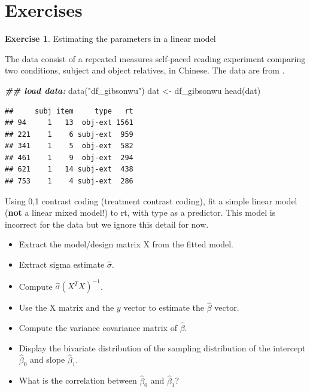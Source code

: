 \documentclass[
  12pt,
]{krantz}
\newenvironment{Shaded}{\begin{snugshade}}{\end{snugshade}}
\newcommand{\DocumentationTok}[1]{\textcolor[rgb]{0.56,0.35,0.01}{\textbf{\textit{#1}}}}
\newcommand{\FunctionTok}[1]{\textcolor[rgb]{0.00,0.00,0.00}{#1}}
\newcommand{\NormalTok}[1]{#1}
\newcommand{\OtherTok}[1]{\textcolor[rgb]{0.56,0.35,0.01}{#1}}
\newcommand{\StringTok}[1]{\textcolor[rgb]{0.31,0.60,0.02}{#1}}
\providecommand{\tightlist}{%
  \setlength{\itemsep}{0pt}\setlength{\parskip}{0pt}}
\theoremstyle{definition}
\theoremstyle{definition}
\theoremstyle{definition}
\newtheorem{exercise}{Exercise}[chapter]
\theoremstyle{definition}
\theoremstyle{remark}
\begin{document}
\hypertarget{sec:LMExercises2}{%
\section{Exercises}\label{sec:LMExercises2}}

\begin{exercise}
\protect\hypertarget{exr:LMparamest}{}\label{exr:LMparamest}Estimating the parameters in a linear model
\end{exercise}

The data consist of a repeated measures self-paced reading experiment comparing two conditions, subject and object relatives, in Chinese. The data are from \citet{gibsonwu}.

\begin{Shaded}
\begin{Highlighting}[]
\DocumentationTok{\#\# load data:}
\FunctionTok{data}\NormalTok{(}\StringTok{"df\_gibsonwu"}\NormalTok{)}
\NormalTok{dat }\OtherTok{\textless{}{-}}\NormalTok{ df\_gibsonwu}
\FunctionTok{head}\NormalTok{(dat)}
\end{Highlighting}
\end{Shaded}

\begin{verbatim}
##     subj item     type   rt
## 94     1   13  obj-ext 1561
## 221    1    6 subj-ext  959
## 341    1    5  obj-ext  582
## 461    1    9  obj-ext  294
## 621    1   14 subj-ext  438
## 753    1    4 subj-ext  286
\end{verbatim}

Using 0,1 contrast coding (treatment contrast coding), fit a simple linear model (\textbf{not} a linear mixed model!) to rt, with type as a predictor. This model is incorrect for the data but we ignore this detail for now.

\begin{itemize}
\tightlist
\item
  Extract the model/design matrix X from the fitted model.
\item
  Extract sigma estimate \(\hat\sigma\).
\item
  Compute \(\hat\sigma (X^TX)^{-1}\).
\item
  Use the X matrix and the \(y\) vector to estimate the \(\hat\beta\) vector.
\item
  Compute the variance covariance matrix of \(\hat\beta\).
\item
  Display the bivariate distribution of the sampling distribution of the intercept \(\hat \beta_0\) and slope \(\hat\beta_1\).
\item
  What is the correlation between \(\hat \beta_0\) and \(\hat\beta_1\)?
\end{itemize}
\end{document}
